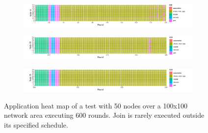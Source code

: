 \begin{figure}[H]
\label{fig:application-map-50-nodes}
    \centering
    \begin{subfigure}{\textwidth}
        \centering
        \includegraphics[width=\textwidth]{figure/Results/ReliabilityDiscussionApplicationHeatmaps/applicationmap50x50_1.pdf}
        \label{subfig:application-map-50-nodes-round-1-199}
    \end{subfigure}
    \hfill
    \begin{subfigure}{\textwidth}
        \centering
        \includegraphics[width=\textwidth]{figure/Results/ReliabilityDiscussionApplicationHeatmaps/applicationmap50x50_2.pdf}
        \label{subfig:application-map-50-nodes-round-200-399}
    \end{subfigure}
    \begin{subfigure}{\textwidth}
        \centering
        \includegraphics[width=\textwidth]{figure/Results/ReliabilityDiscussionApplicationHeatmaps/applicationmap50x50_3.pdf}
        \label{subfig:application-map-50-nodes-round-400-599}
    \end{subfigure}
    \caption{Application heat map of a test with 50 nodes over a 100x100 network area executing 600 rounds. Join is rarely executed outside its specified schedule.}
\end{figure}
